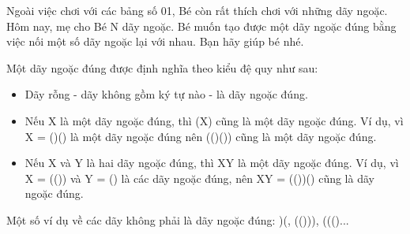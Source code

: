 Ngoài việc chơi với các bảng số 01, Bé còn rất thích chơi với những dãy ngoặc. Hôm nay, mẹ cho Bé N dãy ngoặc. Bé muốn tạo được một dãy ngoặc đúng bằng việc nối một số dãy ngoặc lại với nhau. Bạn hãy giúp bé nhé.  

   Một dãy ngoặc đúng được định nghĩa theo kiểu đệ quy như sau:  
\begin{itemize}
	\item     Dãy rỗng - dãy không gồm ký tự nào - là dãy ngoặc đúng.   
	\item     Nếu X là một dãy ngoặc đúng, thì (X) cũng là một dãy ngoặc đúng. Ví dụ, vì X = ()() là một dãy ngoặc đúng nên (()()) cũng là một dãy ngoặc đúng.   
	\item     Nếu X và Y là hai dãy ngoặc đúng, thì XY là một dãy ngoặc đúng. Ví dụ, vì X = (()) và Y = () là các dãy ngoặc đúng, nên XY = (())() cũng là dãy ngoặc đúng.   
\end{itemize}

   Một số ví dụ về các dãy không phải là dãy ngoặc đúng: )(, (())), ((()...